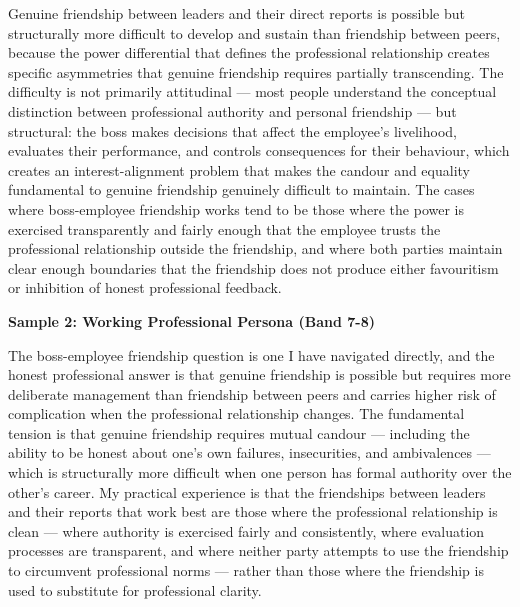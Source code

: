Genuine friendship between leaders and their direct reports is possible but structurally more difficult to develop and sustain than friendship between peers, because the power differential that defines the professional relationship creates specific asymmetries that genuine friendship requires partially transcending. The difficulty is not primarily attitudinal — most people understand the conceptual distinction between professional authority and personal friendship — but structural: the boss makes decisions that affect the employee's livelihood, evaluates their performance, and controls consequences for their behaviour, which creates an interest-alignment problem that makes the candour and equality fundamental to genuine friendship genuinely difficult to maintain. The cases where boss-employee friendship works tend to be those where the power is exercised transparently and fairly enough that the employee trusts the professional relationship outside the friendship, and where both parties maintain clear enough boundaries that the friendship does not produce either favouritism or inhibition of honest professional feedback.

\textbf{Sample 2: Working Professional Persona (Band 7-8)}

The boss-employee friendship question is one I have navigated directly, and the honest professional answer is that genuine friendship is possible but requires more deliberate management than friendship between peers and carries higher risk of complication when the professional relationship changes. The fundamental tension is that genuine friendship requires mutual candour — including the ability to be honest about one's own failures, insecurities, and ambivalences — which is structurally more difficult when one person has formal authority over the other's career. My practical experience is that the friendships between leaders and their reports that work best are those where the professional relationship is clean — where authority is exercised fairly and consistently, where evaluation processes are transparent, and where neither party attempts to use the friendship to circumvent professional norms — rather than those where the friendship is used to substitute for professional clarity.

\separator


